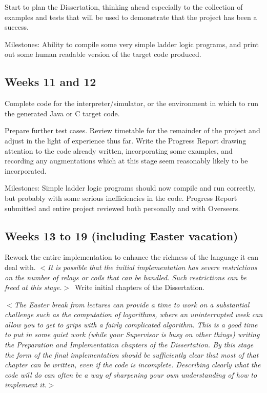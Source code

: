 \documentclass[12pt]{article}
\newcommand{\al}{$<$}
\newcommand{\ar}{$>$}
\begin{document}
Start to plan the Dissertation, thinking ahead especially to the
collection of examples and tests that will be used to demonstrate that
the project has been a success. 

Milestones: Ability to compile some very simple ladder logic programs,
and print out some human readable version of the target code produced.


\subsection*{Weeks 11 and 12}

Complete code for the interpreter/simulator, or the environment in
which to run the generated Java or C target code.

Prepare further test cases.  Review timetable for the remainder of the
project and adjust in the light of experience thus far.  Write the
Progress Report drawing attention to the code already written,
incorporating some examples, and recording any augmentations which at
this stage seem reasonably likely to be incorporated.

Milestones: Simple ladder logic programs should now compile and run
correctly, but probably with some serious inefficiencies in the code.
Progress Report submitted and entire project reviewed both personally
and with Overseers.


\subsection*{Weeks 13 to 19 (including Easter vacation)}

Rework the entire implementation to enhance the
richness of the language it can deal with. \al\emph{It is possible that
the initial implementation has severe restrictions on the number of
relays or coils that can be handled. Such restrictions can be freed at
this stage.}\ar\  Write initial chapters of the Dissertation.

\al\emph{The Easter break from lectures can provide a time to work on a
substantial challenge such as the computation of logarithms, where an
uninterrupted week can allow you to get to grips with a fairly
complicated algorithm.  This is a good time to put in some quiet work
(while your Supervisor is busy on other things) writing the
Preparation and Implementation chapters of the Dissertation.  By this
stage the form of the final implementation should be sufficiently
clear that most of that chapter can be written, even if the code is
incomplete.  Describing clearly what the code will do can often be a
way of sharpening your own understanding of how to implement it.}\ar
\end{document}

